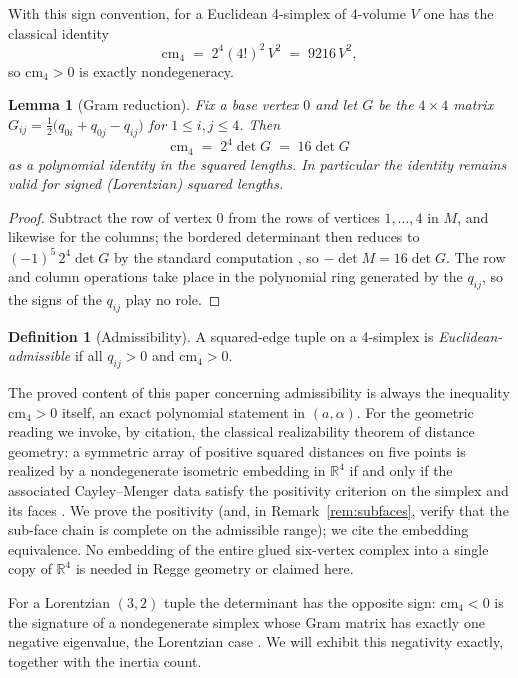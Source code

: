 \documentclass[11pt]{article}
\newtheorem{lemma}[theorem]{Lemma}
\theoremstyle{definition}
\newtheorem{definition}[theorem]{Definition}
\theoremstyle{remark}
\newcommand{\cm}{\mathrm{cm}_{4}}
\newcommand{\R}{\mathbb{R}}
\begin{document}
With this sign convention, for a Euclidean 4-simplex of 4-volume $V$ one has the classical identity
\[
\cm \;=\; 2^{4}(4!)^{2}\,V^{2} \;=\; 9216\,V^{2},
\]
so $\cm>0$ is exactly nondegeneracy.

\begin{lemma}[Gram reduction]
\label{lem:gram}
Fix a base vertex $0$ and let $G$ be the $4\times 4$ matrix
$G_{ij}=\tfrac12\bigl(q_{0i}+q_{0j}-q_{ij}\bigr)$ for $1\le i,j\le 4$. Then
\[
\cm \;=\; 2^{4}\det G \;=\; 16\det G
\]
as a polynomial identity in the squared lengths. In particular the identity remains valid for signed (Lorentzian) squared lengths.
\end{lemma}

\begin{proof}
Subtract the row of vertex $0$ from the rows of vertices $1,\dots,4$ in $M$, and likewise for the columns; the bordered determinant then reduces to $(-1)^{5}\,2^{4}\det G$ by the standard computation \cite{Blumenthal}, so $-\det M=16\det G$. The row and column operations take place in the polynomial ring generated by the $q_{ij}$, so the signs of the $q_{ij}$ play no role.
\end{proof}

\begin{definition}[Admissibility]
\label{def:admissible}
A squared-edge tuple on a 4-simplex is \emph{Euclidean-admissible} if all $q_{ij}>0$ and $\cm>0$.
\end{definition}

The proved content of this paper concerning admissibility is always the inequality $\cm>0$ itself, an exact polynomial statement in $(a,\alpha)$. For the geometric reading we invoke, by citation, the classical realizability theorem of distance geometry: a symmetric array of positive squared distances on five points is realized by a nondegenerate isometric embedding in $\R^{4}$ if and only if the associated Cayley--Menger data satisfy the positivity criterion on the simplex and its faces \cite{Menger,Blumenthal,Berger}. We prove the positivity (and, in Remark~\ref{rem:subfaces}, verify that the sub-face chain is complete on the admissible range); we cite the embedding equivalence. No embedding of the entire glued six-vertex complex into a single copy of $\R^{4}$ is needed in Regge geometry or claimed here.

For a Lorentzian $(3,2)$ tuple the determinant has the opposite sign: $\cm<0$ is the signature of a nondegenerate simplex whose Gram matrix has exactly one negative eigenvalue, the Lorentzian case \cite{AJL,SorkinAngles}. We will exhibit this negativity exactly, together with the inertia count.
\end{document}
